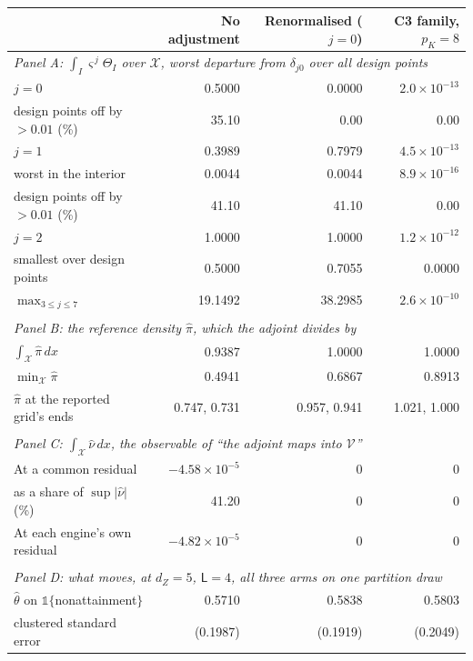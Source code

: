 \begin{tabular}{lrrr}
\toprule
 & No adjustment & Renormalised ($j=0$) & C3 family, $p_K=8$ \\
\midrule
\multicolumn{4}{l}{\textit{Panel A: $\int_I\varsigma^{\,j}\Theta_I$ over $\mathcal X$, worst departure from $\delta_{j0}$ over all design points}} \\
$j=0$ & 0.5000 & 0.0000 & $2.0 \times 10^{-13}$ \\
\quad design points off by $>0.01$ (\%) & 35.10 & 0.00 & 0.00 \\
$j=1$ & 0.3989 & 0.7979 & $4.5 \times 10^{-13}$ \\
\quad worst in the interior & 0.0044 & 0.0044 & $8.9 \times 10^{-16}$ \\
\quad design points off by $>0.01$ (\%) & 41.10 & 41.10 & 0.00 \\
$j=2$ & 1.0000 & 1.0000 & $1.2 \times 10^{-12}$ \\
\quad smallest over design points & 0.5000 & 0.7055 & 0.0000 \\
$\max_{3\le j\le 7}$ & 19.1492 & 38.2985 & $2.6 \times 10^{-10}$ \\
\\[0.5em]
\multicolumn{4}{l}{\textit{Panel B: the reference density $\hat\pi$, which the adjoint divides by}} \\
$\int_{\mathcal X}\hat\pi\,dx$ & 0.9387 & 1.0000 & 1.0000 \\
$\min_{\mathcal X}\hat\pi$ & 0.4941 & 0.6867 & 0.8913 \\
$\hat\pi$ at the reported grid's ends & 0.747, 0.731 & 0.957, 0.941 & 1.021, 1.000 \\
\\[0.5em]
\multicolumn{4}{l}{\textit{Panel C: $\int_{\mathcal X}\hat\nu\,dx$, the observable of ``the adjoint maps into $\mathcal V$''}} \\
At a common residual & $-4.58 \times 10^{-5}$ & $0$ & $0$ \\
\quad as a share of $\sup|\hat\nu|$ (\%) & 41.20 & $0$ & $0$ \\
At each engine's own residual & $-4.82 \times 10^{-5}$ & $0$ & $0$ \\
\\[0.5em]
\multicolumn{4}{l}{\textit{Panel D: what moves, at $d_Z=5$, $\mathsf L=4$, all three arms on one partition draw}} \\
$\hat\theta$ on $\mathbb 1\{$nonattainment$\}$ & 0.5710 & 0.5838 & 0.5803 \\
\quad clustered standard error & (0.1987) & (0.1919) & (0.2049) \\

\end{tabular}
